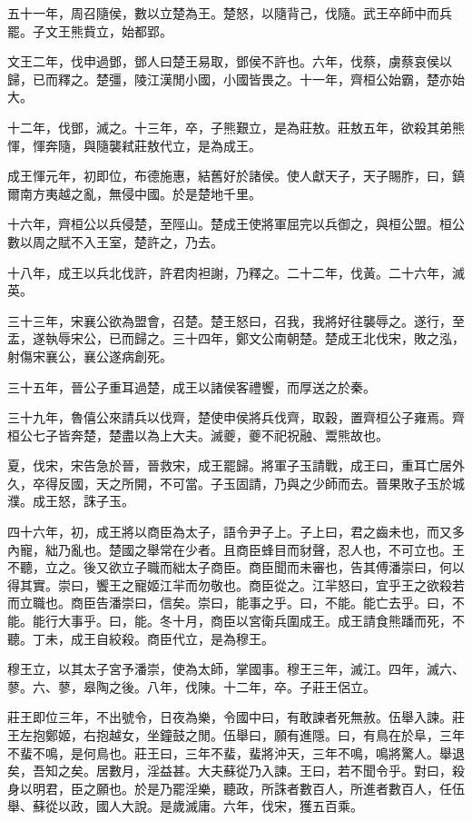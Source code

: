 五十一年，周召隨侯，數以立楚為王。楚怒，以隨背己，伐隨。武王卒師中而兵罷。子文王熊貲立，始都郢。

文王二年，伐申過鄧，鄧人曰楚王易取，鄧侯不許也。六年，伐蔡，虜蔡哀侯以歸，已而釋之。楚彊，陵江漢閒小國，小國皆畏之。十一年，齊桓公始霸，楚亦始大。

十二年，伐鄧，滅之。十三年，卒，子熊艱立，是為莊敖。莊敖五年，欲殺其弟熊惲，惲奔隨，與隨襲弒莊敖代立，是為成王。

成王惲元年，初即位，布德施惠，結舊好於諸侯。使人獻天子，天子賜胙，曰，鎮爾南方夷越之亂，無侵中國。於是楚地千里。

十六年，齊桓公以兵侵楚，至陘山。楚成王使將軍屈完以兵御之，與桓公盟。桓公數以周之賦不入王室，楚許之，乃去。

十八年，成王以兵北伐許，許君肉袒謝，乃釋之。二十二年，伐黃。二十六年，滅英。

三十三年，宋襄公欲為盟會，召楚。楚王怒曰，召我，我將好往襲辱之。遂行，至盂，遂執辱宋公，已而歸之。三十四年，鄭文公南朝楚。楚成王北伐宋，敗之泓，射傷宋襄公，襄公遂病創死。

三十五年，晉公子重耳過楚，成王以諸侯客禮饗，而厚送之於秦。

三十九年，魯僖公來請兵以伐齊，楚使申侯將兵伐齊，取穀，置齊桓公子雍焉。齊桓公七子皆奔楚，楚盡以為上大夫。滅夔，夔不祀祝融、鬻熊故也。

夏，伐宋，宋告急於晉，晉救宋，成王罷歸。將軍子玉請戰，成王曰，重耳亡居外久，卒得反國，天之所開，不可當。子玉固請，乃與之少師而去。晉果敗子玉於城濮。成王怒，誅子玉。

四十六年，初，成王將以商臣為太子，語令尹子上。子上曰，君之齒未也，而又多內寵，絀乃亂也。楚國之舉常在少者。且商臣蜂目而豺聲，忍人也，不可立也。王不聽，立之。後又欲立子職而絀太子商臣。商臣聞而未審也，告其傅潘崇曰，何以得其實。崇曰，饗王之寵姬江羋而勿敬也。商臣從之。江羋怒曰，宜乎王之欲殺若而立職也。商臣告潘崇曰，信矣。崇曰，能事之乎。曰，不能。能亡去乎。曰，不能。能行大事乎。曰，能。冬十月，商臣以宮衛兵圍成王。成王請食熊蹯而死，不聽。丁未，成王自絞殺。商臣代立，是為穆王。

穆王立，以其太子宮予潘崇，使為太師，掌國事。穆王三年，滅江。四年，滅六、蓼。六、蓼，皋陶之後。八年，伐陳。十二年，卒。子莊王侶立。

莊王即位三年，不出號令，日夜為樂，令國中曰，有敢諫者死無赦。伍舉入諫。莊王左抱鄭姬，右抱越女，坐鐘鼓之閒。伍舉曰，願有進隱。曰，有鳥在於阜，三年不蜚不鳴，是何鳥也。莊王曰，三年不蜚，蜚將沖天，三年不鳴，鳴將驚人。舉退矣，吾知之矣。居數月，淫益甚。大夫蘇從乃入諫。王曰，若不聞令乎。對曰，殺身以明君，臣之願也。於是乃罷淫樂，聽政，所誅者數百人，所進者數百人，任伍舉、蘇從以政，國人大說。是歲滅庸。六年，伐宋，獲五百乘。

